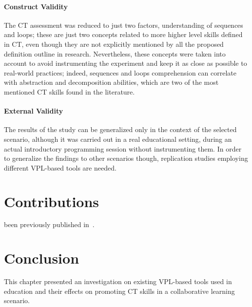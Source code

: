 \paragraph{Construct Validity} The \ac{CT} assessment was reduced to just two factors, understanding of sequences and loops; these are just two concepts related to more higher level skills defined in \ac{CT}, even though they are not explicitly mentioned by all the proposed definition outline in research. Nevertheless, these concepts were taken into account to avoid instrumenting the experiment and keep it as close as possible to real-world practices; indeed, sequences and loops comprehension can correlate with abstraction and decomposition abilities, which are two of the most mentioned \ac{CT} skills found in the literature.

\paragraph{External Validity} The results of the study can be generalized only in the context of the selected scenario, although it was carried out in a real educational setting, during an actual introductory programming session without instrumenting them. In order to generalize the findings to other scenarios though, replication studies employing different \ac{VPL}-based tools are needed.

\section{Contributions}
 been previously published in~\cite{turchi2016fostering,turchi2016human}.

\section{Conclusion}
This chapter presented an investigation on existing \ac{VPL}-based tools used in education and their effects on promoting \ac{CT} skills in a collaborative learning scenario.

